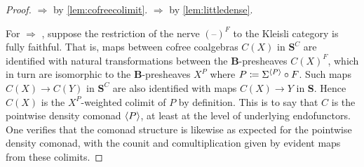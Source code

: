 \documentclass[11pt, oneside, article]{memoir}
\theoremstyle{plain}
\theoremstyle{definition}
\theoremstyle{remark}
\DeclarePairedDelimiter{\gen}{\langle}{\rangle}
\newcommand{\dash}{{\mathord{\text{--}}}}
\newcommand{\imp}{\Rightarrow}
\newcommand{\cat}[1]{\mathbf{#1}}
\newcommand{\CoalgOn}[2]{{#2}^{#1}}
\newcommand{\CoalgS}[1]{\CoalgOn{#1}{\bS}}
\newcommand{\nerve}[1]{(\dash)^{#1}}
\newcommand{\carr}{\Sigma}
\newcommand{\car}[1]{\carr^{#1}}
\newcommand{\carC}{\car{\cC}}
\newcommand{\carP}{\car{\cP}}
\newcommand{\ph}[1]{#1}
\newcommand{\Ho}[1]{#1}
\newcommand{\cmnd}[1]{{#1}}
\newcommand{\xX}{X}
\newcommand{\xY}{Y}
\newcommand{\cC}{\cmnd{C}}
\newcommand{\bB}{\cat{B}}
\newcommand{\bS}{\cat{S}}
\newcommand{\pP}{\ph{P}}
\newcommand{\cP}{\gen{\pP}}
\newcommand{\CS}{\CoalgS{\cC}}
\begin{document}
\begin{proof}
   $\imp$ 
  by \cref{lem:cofreecolimit}.
   $\imp$ 
  by \cref{lem:littledense}.

  For  $\imp$ ,
  suppose the restriction of the nerve $\nerve{F}$ to the Kleisli
  category is fully faithful. That is, maps between cofree coalgebras
  $\cC(\xX)$ in $\CS$ are identified with natural transformations
  between the $\bB$-presheaves %
  $\cC(\xX)^{F}$, which in turn are isomorphic to the $\bB$-presheaves
  $\xX^\pP$ where $\pP \coloneqq \carP \circ F$. Such maps
  $\cC(\xX) \to \cC(\xY)$ in $\CS$ are also identified with maps
  $\cC(\xX) \to \xY$ in $\bS$. Hence $\cC(\xX)$ is the
  $\xX^\pP$-weighted colimit of $\pP$ by definition. This is to say
  that $\cC$ is the pointwise density comonad $\cP$, at least at the
  level of underlying endofunctors.
  One verifies that the comonad structure is likewise as expected
  for the pointwise density comonad, with the counit and
  comultiplication given by evident maps from these colimits.


\end{proof}
\end{document}
